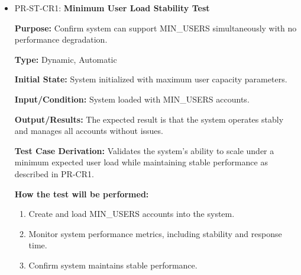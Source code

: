 \documentclass[12pt, titlepage]{article}
\begin{document}
\begin{itemize}
  \item PR-ST-CR1: \textbf{Minimum User Load Stability Test}
  \begin{mdframed}[linewidth=0.5mm]
      \textbf{Purpose:} Confirm system can support MIN\_USERS simultaneously with no performance degradation. \par
      \textbf{Type:} Dynamic, Automatic \par
      \textbf{Initial State:} System initialized with maximum user capacity parameters. \par
      \textbf{Input/Condition:} System loaded with MIN\_USERS accounts. \par
      \textbf{Output/Results:} The expected result is that the system operates stably and manages all accounts without issues. \par
      \textbf{Test Case Derivation:} Validates the system’s ability to scale under a minimum expected user load while maintaining stable performance as described in PR-CR1. \par
      \textbf{How the test will be performed:}
      \begin{enumerate}[noitemsep]
        \item Create and load MIN\_USERS accounts into the system.
        \item Monitor system performance metrics, including stability and response time.
        \item Confirm system maintains stable performance.
      \end{enumerate}
  \end{mdframed}


\end{itemize}
\end{document}
